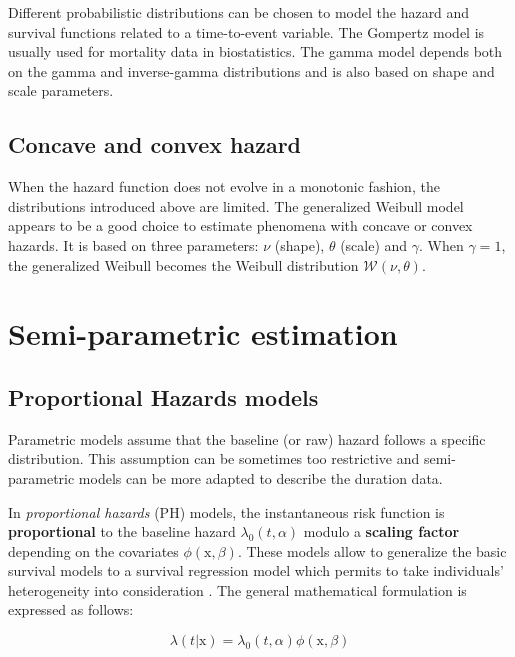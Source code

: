 \documentclass[
]{book}
\begin{document}
Different probabilistic distributions can be chosen to model the hazard and survival functions related to a time-to-event variable. The Gompertz model is usually used for mortality data in biostatistics. The gamma model depends both on the gamma and inverse-gamma distributions and is also based on shape and scale parameters.

\hypertarget{concave-and-convex-hazard}{%
\subsection{Concave and convex hazard}\label{concave-and-convex-hazard}}

When the hazard function does not evolve in a monotonic fashion, the distributions introduced above are limited. The generalized Weibull model appears to be a good choice to estimate phenomena with concave or convex hazards. It is based on three parameters: \(\nu\) (shape), \(\theta\) (scale) and \(\gamma\). When \(\gamma = 1\), the generalized Weibull becomes the Weibull distribution \(\mathcal{W}(\nu, \theta)\).

\hypertarget{semi-parametric-estimation}{%
\section{Semi-parametric estimation}\label{semi-parametric-estimation}}

\hypertarget{proportional-hazards-models}{%
\subsection{Proportional Hazards models}\label{proportional-hazards-models}}

Parametric models assume that the baseline (or raw) hazard follows a specific distribution. This assumption can be sometimes too restrictive and semi-parametric models can be more adapted to describe the duration data.

In \emph{proportional hazards} (PH) models, the instantaneous risk function is \textbf{proportional} to the baseline hazard \(\lambda_0 (t,\alpha)\) modulo a \textbf{scaling factor} depending on the covariates \(\phi(\pmb{\mathrm{x}}, \beta)\). These models allow to generalize the basic survival models to a survival regression model which permits to take individuals' heterogeneity into consideration \citep{RMS}. The general mathematical formulation is expressed as follows:

\begin{equation}
    \lambda(t|\pmb{\mathrm{x}}) = \lambda_0 (t,\alpha)  \phi(\pmb{\mathrm{x}}, \beta) 
    \label{eq:ph}
\end{equation}
\end{document}
